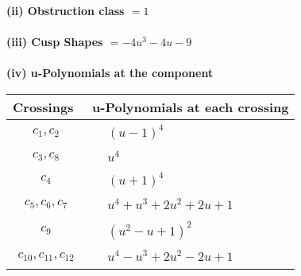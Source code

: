 \documentclass[1p]{elsarticle_modified}
\theoremstyle{definition}
\begin{document}
\flushleft \textbf{(ii) Obstruction class $= 1$}\\~\\
\flushleft \textbf{(iii) Cusp Shapes $= -4 u^3-4 u-9$}\\~\\
\newpage\renewcommand{\arraystretch}{1}
\flushleft \textbf{(iv) u-Polynomials at the component}\newline \\
\begin{tabular}{m{50pt}|m{274pt}}
Crossings & \hspace{64pt}u-Polynomials at each crossing \\
\hline $$\begin{aligned}c_{1},c_{2}\end{aligned}$$&$\begin{aligned}
&(u-1)^4
\end{aligned}$\\
\hline $$\begin{aligned}c_{3},c_{8}\end{aligned}$$&$\begin{aligned}
&u^4
\end{aligned}$\\
\hline $$\begin{aligned}c_{4}\end{aligned}$$&$\begin{aligned}
&(u+1)^4
\end{aligned}$\\
\hline $$\begin{aligned}c_{5},c_{6},c_{7}\end{aligned}$$&$\begin{aligned}
&u^4+u^3+2 u^2+2 u+1
\end{aligned}$\\
\hline $$\begin{aligned}c_{9}\end{aligned}$$&$\begin{aligned}
&(u^2- u+1)^2
\end{aligned}$\\
\hline $$\begin{aligned}c_{10},c_{11},c_{12}\end{aligned}$$&$\begin{aligned}
&u^4- u^3+2 u^2-2 u+1
\end{aligned}$\\
\hline
\end{tabular}\\~\\
\end{document}
